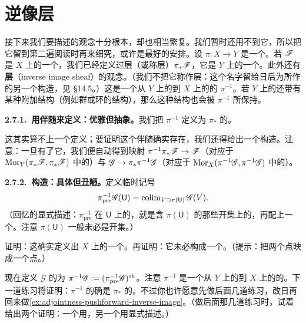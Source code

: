 
\section{逆像层}

接下来我们要描述的观念十分根本，却也相当繁复。我们暂时还用不到它，所以把它留到第二遍阅读时再来细究，或许是最好的安排。设 $\pi\colon X\to Y$ 是一个\trContinuousMap。若 $\mathscr{F}$ 是 $X$ 上的一个\trSheaf，我们已经定义过\trPushforward{}层（或称\trDirectImage{}层）$\pi_*\mathscr{F}$，它是 $Y$ 上的一个\trSheaf。此外还有\textbf{\trInverseImage{}层}（inverse image sheaf）的观念。（我们不把它称作\trPullback{}层：这个名字留给日后为\trQCSheaf{}所作的另一个构造，见 \S14.5。）这是一个从 $Y$ 上的\trSheaves{}到 $X$ 上的\trSheaves{}的\trCovariantFunctor{} $\pi^{-1}$。若 $Y$ 上的\trSheaves{}还带有某种附加结构（例如群或环的结构），那么这种结构也会被 $\pi^{-1}$ 所保持。

\textbf{2.7.1.\ 用伴随来定义：优雅但抽象。}\quad 我们把\trInverseImage{} $\pi^{-1}$ 定义为 $\pi_*$ 的\trLeftAdjoint。

这其实算不上一个定义；要证明这个伴随确实存在，我们还得给出一个构造。注意：一旦有了它，我们便自动得到\trCanonical{}映射 $\pi^{-1}\pi_*\mathscr{F}\to\mathscr{F}$（对应于 $\operatorname{Mor}_Y(\pi_*\mathscr{F},\pi_*\mathscr{F})$ 中的\trIdMorphism{}）与 $\mathscr{G}\to\pi_*\pi^{-1}\mathscr{G}$（对应于 $\operatorname{Mor}_X(\pi^{-1}\mathscr{G},\pi^{-1}\mathscr{G})$ 中的\trIdMorphism{}）。

\textbf{2.7.2.\ 构造：具体但丑陋。}\quad 定义临时记号
\[
\pi^{-1}_{\mathrm{pre}}\mathscr{G}(\mathsf{U})=\operatorname{colim}_{V\supset\pi(\mathsf{U})}\mathscr{G}(V).
\]
（回忆\trColimit{}的显式描述：$\pi^{-1}_{\mathrm{pre}}$ 在 $\mathsf{U}$ 上的\trSection，就是含 $\pi(\mathsf{U})$ 的那些开集上的\trSection，再配上一个\trEquivalenceRelation。注意 $\pi(\mathsf{U})$ 一般未必是开集。）

\begin{exercise}\label{ex:inverse-image-presheaf}
证明：这确实定义出 $X$ 上的一个\trPresheaf。再证明：它未必构成一个\trSheaf。（提示：把两个点映成一个点。）
\end{exercise}

现在定义 $\mathscr{G}$ 的\textbf{\trInverseImage}为 $\pi^{-1}\mathscr{G}:=(\pi^{-1}_{\mathrm{pre}}\mathscr{G})^{\mathrm{sh}}$。注意 $\pi^{-1}$ 是一个从 $Y$ 上的\trSheaves{}到 $X$ 上的\trSheaves{}的\trFunctor。下一道练习将证明：$\pi^{-1}$ 的确是 $\pi_*$ 的\trLeftAdjoint。不过你也许愿意先做后面几道练习，改日再回来做\cref{ex:adjointness-pushforward-inverse-image}。（做后面那几道练习时，试着给出两个证明：一个用\trUniversalProperty，另一个用显式描述。）


